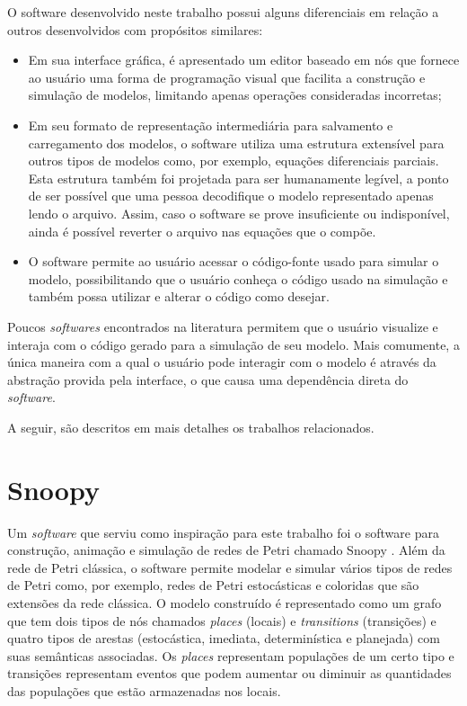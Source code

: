 \documentclass[
	12pt,				%
	openright,			%
	oneside,			%
	a4paper,			%
	main=brazil,
	english,			%
	]{ufsj-abntex2}
\begin{document}
O software desenvolvido neste trabalho possui alguns diferenciais em relação a outros desenvolvidos com propósitos similares:

\begin{itemize}
    \item Em sua interface gráfica, é apresentado um editor baseado em nós que fornece ao usuário uma forma de programação visual que facilita a construção e simulação de modelos, limitando apenas operações consideradas incorretas;
    
    \item Em seu formato de representação intermediária para salvamento e carregamento dos modelos, o software utiliza uma estrutura extensível para outros tipos de modelos como, por exemplo, equações diferenciais parciais. Esta estrutura também foi projetada para ser humanamente legível, a ponto de ser possível que uma pessoa decodifique o modelo representado apenas lendo o arquivo. Assim, caso o software se prove insuficiente ou indisponível, ainda é possível reverter o arquivo nas equações que o compõe. 
    
    \item O software permite ao usuário acessar o código-fonte usado para simular o modelo, possibilitando que o usuário conheça o código usado na simulação e também possa utilizar e alterar o código como desejar.   
\end{itemize}

Poucos \textit{softwares} encontrados na literatura permitem que o usuário visualize e interaja com o código gerado para a simulação de seu modelo. Mais comumente, a única maneira com a qual o usuário pode interagir com o modelo é através da abstração provida pela interface, o que causa uma dependência direta do \textit{software}.

A seguir, são descritos em mais detalhes os trabalhos relacionados. 

\section{Snoopy}

Um \textit{software} que serviu como inspiração para este trabalho foi o software para construção, animação e simulação de redes de Petri chamado Snoopy \cite{Heiner2008,Heiner2012,Liu2012}. Além da rede de Petri clássica, o software permite modelar e simular vários tipos de redes de Petri como, por exemplo, redes de Petri estocásticas e coloridas que são extensões da rede clássica. O modelo construído é representado como um grafo que tem dois tipos de nós chamados \textit{places} (locais) e \textit{transitions} (transições) e quatro tipos de arestas (estocástica, imediata, determinística e planejada) com suas semânticas associadas. Os \textit{places} representam populações de um certo tipo e transições representam eventos que podem aumentar ou diminuir as quantidades das populações que estão armazenadas nos locais. 
\end{document}
